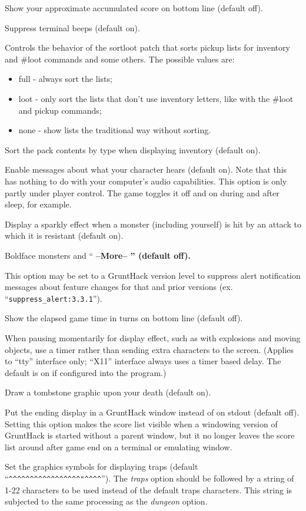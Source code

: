Show your approximate accumulated score on bottom line (default off).
\item[\tb{``silent  ''}]
Suppress terminal beeps (default on).
\item[\tb{sortloot}]
Controls the behavior of the sortloot patch that sorts pickup lists for
inventory and \#loot commands and some others.
The possible values are:
\begin{itemize}
\item full - always sort the lists;
\item loot - only sort the lists that don't use inventory
       letters, like with the \#loot and pickup commands;
\item none - show lists the traditional way without sorting.
\end{itemize}
\item[\tb{sortpack}]
Sort the pack contents by type when displaying inventory (default on).
\item[\tb{sound}]
Enable messages about what your character hears (default on).
Note that this has nothing to do with your computer's audio capabilities.
This option is only partly under player control.  The game toggles it
off and on during and after sleep, for example.
\item[\tb{sparkle}]
Display a sparkly effect when a monster (including yourself) is hit by an
attack to which it is resistant (default on).
\item[\tb{standout}]
Boldface monsters and ``%
\bf --More--\rm%
'' (default off).
\item[\tb{suppress\_alert}]
This option may be set to a GruntHack version level to suppress
alert notification messages about feature changes for that 
and prior versions (ex. ``{\tt suppress\_alert:3.3.1}'').
\item[\tb{``time    ''}]
Show the elapsed game time in turns on bottom line (default off).
\item[\tb{timed\_delay}]
When pausing momentarily for display effect, such as with explosions and
moving objects, use a timer rather than sending extra characters to the
screen.  (Applies to ``tty'' interface only; ``X11'' interface always
uses a timer based delay.  The default is on if configured into the
program.)
\item[\tb{tombstone}]
Draw a tombstone graphic upon your death (default on).
\item[\tb{toptenwin}]
Put the ending display in a GruntHack window instead of on stdout (default off).
Setting this option makes the score list visible when a windowing version
of GruntHack is started without a parent window, but it no longer leaves
the score list around after game end on a terminal or emulating window.
\item[\tb{traps}]
Set the graphics symbols for displaying traps (default
``\verb&^^^^^^^^^^^^^^^^^"^^^^&'').
The
{\it traps }
option should be followed by a string of 1-22
characters to be used instead of the default traps characters.
This string is subjected to the same processing as the
{\it dungeon }
option.

